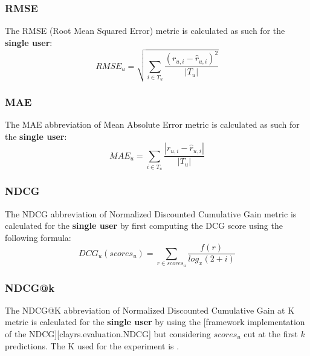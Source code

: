 \documentclass[11pt]{article}
\begin{document}

\subsubsection{RMSE}\label{subsubsec:rmse}
The RMSE (Root Mean Squared Error) metric is calculated as such for the \textbf{single user}:
\hfill\break
\hfill\break
    \[
        RMSE_u = \sqrt{\sum_{i \in T_u} \frac{(r_{u,i} - \hat{r}_{u,i})^2}{|T_u|}}
    \]
\hfill\break


\subsubsection{MAE}\label{subsubsec:mae}
The MAE abbreviation of Mean Absolute Error metric is calculated as such for the \textbf{single user}:
\hfill\break
\hfill\break
    \[
        MAE_u = \sum_{i \in T_u} \frac{|r_{u,i} - \hat{r}_{u,i}|}{|T_u|}
    \]
\hfill\break


\subsubsection{NDCG}\label{subsubsec:ndcg}
The NDCG abbreviation of Normalized Discounted Cumulative Gain metric is calculated for the \textbf{single user}
by first computing the DCG score using the following formula:
\hfill\break
\hfill\break
    \[
        DCG_{u}(scores_{u}) = \sum_{r\in scores_{u}}{\frac{f(r)}{log_x(2 + i)}}
    \]
\hfill\break

\subsubsection{NDCG@k}\label{subsubsec:ndcg-k}
The NDCG@K abbreviation of Normalized Discounted Cumulative Gain at K metric is calculated for the \textbf{single user}
by using the [framework implementation of the NDCG][clayrs.evaluation.NDCG] but considering $scores_{u}$ cut at the
first $k$ predictions.
The K used for the experiment is .
\hfill\break


\end{document}
